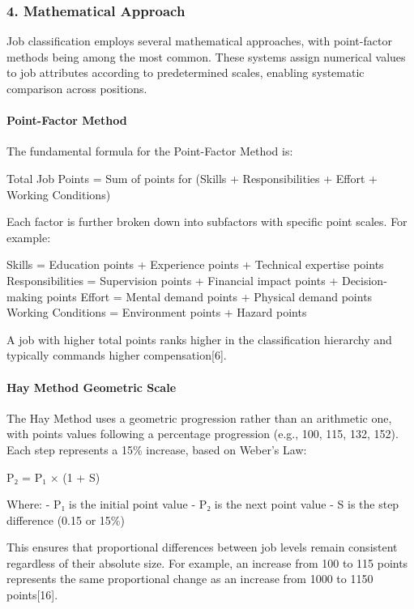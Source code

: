 \documentclass[./main.tex]{subfiles}
\begin{document}
\subsubsection{4. Mathematical Approach}\label{mathematical-approach}

Job classification employs several mathematical approaches, with
point-factor methods being among the most common. These systems assign
numerical values to job attributes according to predetermined scales,
enabling systematic comparison across positions.

\paragraph{Point-Factor Method}\label{point-factor-method}

The fundamental formula for the Point-Factor Method is:

Total Job Points = Sum of points for (Skills + Responsibilities + Effort
+ Working Conditions)

Each factor is further broken down into subfactors with specific point
scales. For example:

Skills = Education points + Experience points + Technical expertise
points Responsibilities = Supervision points + Financial impact points +
Decision-making points Effort = Mental demand points + Physical demand
points Working Conditions = Environment points + Hazard points

A job with higher total points ranks higher in the classification
hierarchy and typically commands higher compensation{[}6{]}.

\paragraph{Hay Method Geometric
Scale}\label{hay-method-geometric-scale}

The Hay Method uses a geometric progression rather than an arithmetic
one, with points values following a percentage progression (e.g., 100,
115, 132, 152). Each step represents a 15\% increase, based on Weber's
Law:

P₂ = P₁ × (1 + S)

Where: - P₁ is the initial point value - P₂ is the next point value - S
is the step difference (0.15 or 15\%)

This ensures that proportional differences between job levels remain
consistent regardless of their absolute size. For example, an increase
from 100 to 115 points represents the same proportional change as an
increase from 1000 to 1150 points{[}16{]}.
\end{document}
